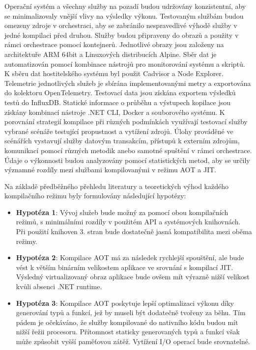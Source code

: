 Operační systém a všechny služby na pozadí budou udržovány konzistentní, aby se minimalizovaly vnější vlivy na výsledky výkonu. Testovaným službám budou omezeny zdroje v orchestraci, aby se zabránilo nespravedlivé výhodě služby v jedné kompilaci před druhou. Služby budou připraveny do obrazů a použity v rámci orchestrace pomocí kontejnerů. Jednotlivé obrazy jsou založeny na architektuře ARM 64bit a Linuxových distribucích Alpine. Sběr dat je automatizován pomocí kombinace nástrojů pro monitorování systému a skriptů. K sběru dat hostitelského systému byl použit Cadvisor a Node Explorer. Telemetrie jednotlivých služeb je sbírána implementovanými metry a exportována do kolektoru OpenTelemetry. Testovací data jsou získána exportem výsledků testů do InfluxDB. Statické informace o průběhu a výstupech kopilace jsou získány kombinací nástroje .NET CLI, Docker a souborového systému. K porovnání strategií kompilace při různých podmínkách využívají testovací služby vybrané scénáře testující propustnost a vytížení zdrojů. Úlohy prováděné ve scénářích vystavují služby datovým transakcím, přístupů k externím zdrojům, komunikací pomocí různých metodik anebo samotné spuštění v rámci orchestrace. Údaje o výkonnosti budou analyzovány pomocí statistických metod, aby se určily významné rozdíly mezi službami kompilovanými v režimu AOT a JIT. 


Na základě předběžného přehledu literatury a teoretických výhod každého kompilačního režimu byly formulovány následující hypotézy:

\begin{itemize}
    \item \textbf{Hypotéza 1}: Vývoj služeb bude možný za pomocí obou kompilačních režimů, s minimálními rozdíly v použitém API a systémových knihovnách. Při použití knihoven 3. stran bude dostatečně jasná kompatibilita mezi oběma režimy.
    \item \textbf{Hypotéza 2}: Kompilace AOT má za následek rychlejší spouštění, ale bude vést k větším binárním velikostem aplikace ve srovnání s kompilací JIT. Výsledný virtualizovaný obraz aplikace bude ovšem mít výrazně nižší velikost kvůli absenci .NET runtime.
    \item \textbf{Hypotéza 3}: Kompilace AOT poskytuje lepší optimalizaci výkonu díky generování typů a funkcí, jež by museli být dodatečně tvořeny za běhu. Tím pádem je očekáváno, že služby kompilované do nativního kódu budou mít nižší řežii procesoru. Přítomnost staticky generovaných typů a funkcí však může způsobit vyšší paměťovou zátěž. Vytížení I/O operací bude srovnatelné.
\end{itemize}

